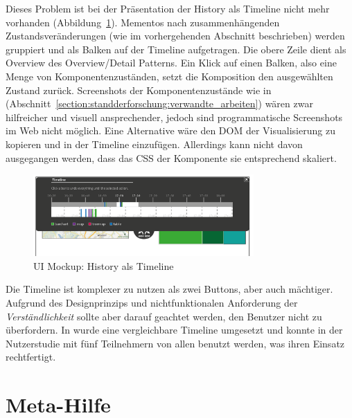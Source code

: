 \documentclass[
	headsepline,
	footsepline,
	fontsize=12pt,
	bibliography=totoc
]{scrbook}
\begin{document}
Dieses Problem ist bei der Präsentation der History als Timeline nicht mehr vorhanden (Abbildung~\ref{figure:undo-timeline-simple}). Mementos nach zusammenhängenden Zustandsveränderungen (wie im vorhergehenden Abschnitt beschrieben) werden gruppiert und als Balken auf der Timeline aufgetragen. Die obere Zeile dient als Overview des Overview/Detail Patterns. Ein Klick auf einen Balken, also eine Menge von Komponentenzuständen, setzt die Komposition den ausgewählten Zustand zurück. Screenshots der Komponentenzustände wie in \cite{Heer2008} (Abschnitt~\ref{section:standderforschung:verwandte_arbeiten}) wären zwar hilfreicher und visuell ansprechender, jedoch sind programmatische Screenshots im Web nicht möglich. Eine Alternative wäre den DOM der Visualisierung zu kopieren und in der Timeline einzufügen. Allerdings kann nicht davon ausgegangen werden, dass das CSS der Komponente sie entsprechend skaliert.

\begin{figure}[htbp]
   \centering
   \includegraphics[width=0.75\textwidth]{images/konzeption-undo-timeline-simple.png}
   \caption{UI Mockup: History als Timeline}
   \label{figure:undo-timeline-simple}
\end{figure}

Die Timeline ist komplexer zu nutzen als zwei Buttons, aber auch mächtiger. Aufgrund des Designprinzips und nichtfunktionalen Anforderung der \emph{Verständlichkeit} sollte aber darauf geachtet werden, den Benutzer nicht zu überfordern. In \cite{Piccolotto2012} wurde eine vergleichbare Timeline umgesetzt und konnte in der Nutzerstudie mit fünf Teilnehmern von allen benutzt werden, was ihren Einsatz rechtfertigt.

\section{Meta-Hilfe}
\label{section:konzeption:meta-hilfe}

\end{document}
